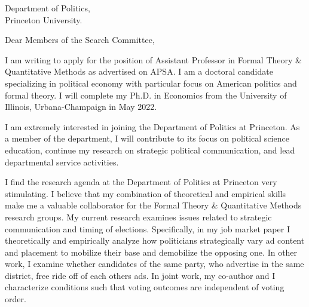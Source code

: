 \documentclass[12pt]{letter}
\begin{document}
\date{}
\begin{letter}{Department of Politics,\\
Princeton University.}

\opening{Dear Members of the Search Committee,}

I am writing to apply for the position of Assistant Professor in Formal Theory \& Quantitative Methods as advertised on APSA.
I am a doctoral candidate specializing in political economy with particular focus on American politics and formal theory.
I will complete my Ph.D. in Economics from the University of Illinois, Urbana-Champaign in May 2022. 

I am extremely interested in joining the Department of Politics at Princeton.
As a member of the department, I will contribute to its focus on political science education,
continue my research on strategic political communication, and lead departmental service activities.
%

I find the research agenda at the Department of Politics at Princeton very stimulating.
I believe that my combination of theoretical and empirical skills make me a valuable collaborator for the Formal Theory \& Quantitative Methods research groups.
My current research examines issues related to strategic communication and timing of elections.
Specifically, in my job market paper I theoretically and empirically analyze how politicians strategically vary ad content and placement to mobilize their base and demobilize the opposing one.
In other work, I examine whether candidates of the same party, who advertise in the same district, free ride off of each others ads.
In joint work, my co-author and I characterize conditions such that voting outcomes are independent of voting order.


\end{letter}
\end{document}
